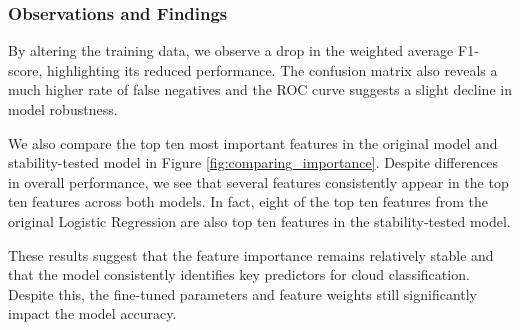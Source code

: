 \documentclass[11pt,letterpaper]{article}
\begin{document}
\vspace{1em} %
\subsubsection{Observations and Findings}
\vspace{0.5em} %
By altering the training data, we observe a drop in the weighted average F1-score, highlighting its reduced performance. The confusion matrix also reveals a much higher rate of false negatives and the ROC curve suggests a slight decline in model robustness.

We also compare the top ten most important features in the original model and stability-tested model in Figure \ref{fig:comparing_importance}. Despite differences in overall performance, we see that several features consistently appear in the top ten features across both models. In fact, eight of the top ten features from the original Logistic Regression are also top ten features in the stability-tested model. 

These results suggest that the feature importance remains relatively stable and that the model consistently identifies key predictors for cloud classification. Despite this, the fine-tuned parameters and feature weights still significantly impact the model accuracy.
\end{document}
